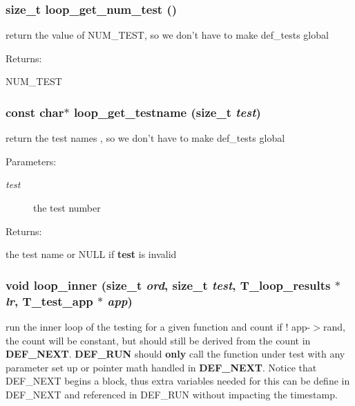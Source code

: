 \subsubsection{\setlength{\rightskip}{0pt plus 5cm}size\_\-t loop\_\-get\_\-num\_\-test ()}\label{group__loop__test_a1}


return the value of NUM\_\-TEST, so we don't have to make def\_\-tests global

\begin{Desc}
\item[Returns: ]\par
NUM\_\-TEST \end{Desc}
\subsubsection{\setlength{\rightskip}{0pt plus 5cm}const char$\ast$ loop\_\-get\_\-testname (size\_\-t {\em test})}\label{group__loop__test_a2}


return the test names , so we don't have to make def\_\-tests global

\begin{Desc}
\item[Parameters: ]\par
\begin{description}
\item[{\em 
test}]the test number \end{description}
\end{Desc}
\begin{Desc}
\item[Returns: ]\par
the test name or NULL if {\bf test} is invalid \end{Desc}
\subsubsection{\setlength{\rightskip}{0pt plus 5cm}void loop\_\-inner (size\_\-t {\em ord}, size\_\-t {\em test}, {\bf T\_\-loop\_\-results} $\ast$ {\em lr}, {\bf T\_\-test\_\-app} $\ast$ {\em app})}\label{group__loop__test_a6}


run the inner loop of the testing for a given function and count if ! app-$>$rand, the count will be constant, but should still be derived from the count in {\bf DEF\_\-NEXT}. {\bf DEF\_\-RUN} should {\bf only} call the function under test with any parameter set up or pointer math handled in {\bf DEF\_\-NEXT}. Notice that DEF\_\-NEXT begins a block, thus extra variables needed for this can be define in DEF\_\-NEXT and referenced in DEF\_\-RUN without impacting the timestamp.

